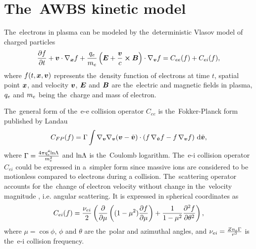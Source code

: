 \section{The~AWBS kinetic model}
\label{sec:AWBSmodel}

The~electrons in plasma can be modeled by the~deterministic Vlasov model 
of charged particles
\begin{equation}
  \frac{\partial{f}}{\partial{t}} + \boldsymbol{v}\cdot\nabla_{\boldsymbol{x}} f + 
  \frac{q_e}{m_e}\left(\boldsymbol{E} + \frac{\boldsymbol{v}}{c}\boldsymbol{\times}\boldsymbol{B}\right)\cdot\nabla_{\boldsymbol{v}} f = 
  C_{ee}(f) + C_{ei}(f) ,
  \label{eq:kinetic_equation}
\end{equation}
where $f(t, \boldsymbol{x}, \boldsymbol{v})$ represents the~density function of electrons
at time $t$, spatial point $\boldsymbol{x}$, and velocity $\boldsymbol{v}$, $\boldsymbol{E}$ and $\boldsymbol{B}$ are 
the~electric and magnetic fields in plasma, $q_e$ and $m_e$ being 
the~charge and mass of electron.

The~general form of the~e-e collision operator 
$C_{ee}$ is the~Fokker-Planck form published by Landau \cite{Landau_1936}
\begin{equation}
  C_{FP}(f) =
  \Gamma\int \nabla_{\boldsymbol{v}}\nabla_{\boldsymbol{v}}(\boldsymbol{v} - \tilde{\boldsymbol{v}}) \cdot \left(
  f\, \nabla_{\tilde{\boldsymbol{v}}} f - f\, \nabla_{\boldsymbol{v}} f \right)\, \text{d}\tilde{\boldsymbol{v}} ,
  \label{eq:LFP_model}
\end{equation}
where $\Gamma = \frac{4\pi q_e^4\text{ln}\Lambda}{m_e^2}$ and 
$\text{ln}\Lambda$ is the~Coulomb logarithm.
The~e-i collision operator $C_{ei}$ could be expressed
in a~simpler form since massive ions are considered 
to be motionless compared to electrons during a collision. 
The~scattering operator accounts
for the~change of electron velocity without change in the~velocity magnitude
, i.e. angular scattering. 
It is expressed in spherical coordinates as
\begin{equation}
  C_{ei}(f) = \frac{\nu_{ei}}{2}
  \left(\frac{\partial{}}{\partial{\mu}}\left((1 - \mu^2)\frac{\partial{f}}{\partial{\mu}}\right)
  + \frac{1}{1 - \mu^2}\frac{\partial^2 f}{\partial\theta^2} \right) ,
  \label{eq:ei_scattering}
\end{equation}
where $\mu = \cos\phi$, $\phi$ and $\theta$ are the~polar and azimuthal 
angles, and $\nu_{ei} = \frac{Z n_e \Gamma}{v^3}$ is the~e-i
collision frequency.

